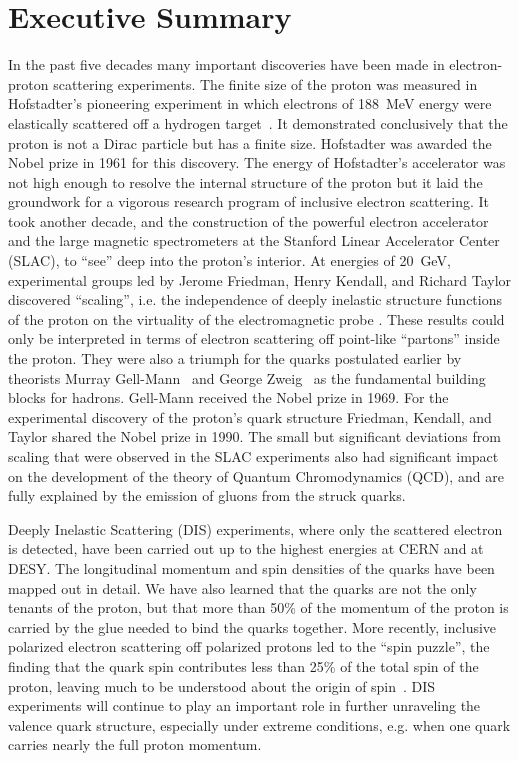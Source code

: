 \chapter{Executive Summary}

In the past five decades many important discoveries have been made  
in electron-proton scattering experiments.  The finite size of the 
proton was measured in Hofstadter's pioneering experiment in which 
electrons of 188~MeV energy were elastically scattered off a hydrogen 
target~\cite{hofstadter}.  It demonstrated conclusively that the proton 
is not a Dirac particle but has a finite size. Hofstadter was awarded 
the Nobel prize in 1961 for this discovery.  The energy of Hofstadter's 
accelerator was not high enough to resolve the internal structure of the 
proton but it laid the groundwork for a vigorous research program of 
inclusive electron scattering.  It took another decade, and the 
construction of the powerful electron accelerator and the large magnetic 
spectrometers at the Stanford Linear Accelerator Center (SLAC), to ``see'' 
deep into the proton's interior.  At energies of 20~GeV, experimental 
groups led by Jerome Friedman, Henry Kendall, and Richard Taylor discovered 
``scaling'', i.e. the independence of deeply inelastic structure functions 
of the proton on the virtuality of the electromagnetic probe
\cite{scaling, scaling2}.  These results could only be interpreted in 
terms of electron scattering off point-like ``partons'' inside the proton. 
They were also a triumph for the quarks postulated earlier by theorists 
Murray Gell-Mann~\cite{gellmann} and George Zweig~\cite{zweig} as the 
fundamental building blocks for hadrons.  Gell-Mann received the Nobel 
prize in 1969. For the experimental discovery of the proton's quark structure 
Friedman, Kendall, and Taylor shared the Nobel prize in 1990.  The small 
but significant deviations from scaling that were observed in the SLAC 
experiments also had significant impact on the development of the theory 
of Quantum Chromodynamics (QCD), and are fully explained by the emission 
of gluons from the struck quarks. 

Deeply Inelastic Scattering (DIS) experiments, where only the scattered 
electron is detected, have been carried out up to the highest energies at 
CERN and at DESY. The longitudinal momentum and spin densities of the
quarks have been mapped out in detail.  We have also learned that the 
quarks are not the only tenants of the proton, but that more than 50\% of 
the momentum of the proton is carried by the glue needed to bind the quarks 
together.  More recently, inclusive polarized electron scattering off 
polarized protons led to the ``spin puzzle'', the finding that the quark 
spin contributes less than 25\% of the total spin of the proton, leaving 
much to be understood about the origin of spin~\cite{filipone}.  DIS 
experiments will continue to play an important role in further unraveling 
the valence quark structure, especially under extreme conditions, e.g. 
when one quark carries nearly the full proton momentum.

